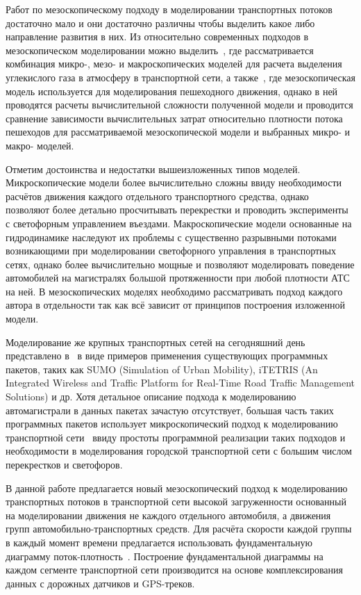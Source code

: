 Работ по мезоскопическому подходу в моделировании транспортных потоков достаточно мало и они достаточно различны чтобы выделить какое либо направление развития в них.
Из относительно современных подходов в мезоскопическом моделировании можно выделить~\autocite{oskarbski2018applying}, где рассматривается комбинация микро-, мезо- и макроскопических моделей для расчета выделения углекислого газа в атмосферу в транспортной сети, а также~\autocite{tordeux2018mesoscopic}, где мезоскопическая модель используется для моделирования пешеходного движения, однако в ней проводятся расчеты вычислительной сложности полученной модели и проводится сравнение зависимости вычислительных затрат относительно плотности потока пешеходов для рассматриваемой мезоскопической модели и выбранных микро- и макро- моделей.

Отметим достоинства и недостатки вышеизложенных типов моделей. 
Микроскопические модели более вычислительно сложны ввиду необходимости расчётов движения каждого отдельного транспортного средства, однако позволяют более детально просчитывать перекрестки и проводить эксперименты с светофорным управлением въездами. 
Макроскопические модели основанные на гидродинамике наследуют их проблемы с существенно разрывными потоками возникающими при моделировании светофорного управления в транспортных сетях, однако более вычислительно мощные и позволяют моделировать поведение автомобилей на магистралях большой протяженности при любой плотности АТС на ней.
В мезоскопических моделях необходимо рассматривать подход каждого автора в отдельности так как всё зависит от принципов построения изложенной модели.

Моделирование же крупных транспортных сетей на сегодняшний день представлено в~\autocite{asano2015traffic, bieker2015traffic} в
виде примеров применения существующих программных пакетов, таких как SUMO (Simulation of Urban Mobility),
iTETRIS (An Integrated Wireless and Traffic Platform for Real-Time Road Traffic Management Solutions) и др.
Хотя детальное описание подхода к моделированию автомагистрали в данных пакетах зачастую отсутствует, большая часть таких программных пакетов использует микроскопический подход к моделированию транспортной сети~\autocite{ratrout2009comparative} ввиду простоты программной реализации таких подходов и необходимости в моделирования городской транспортной сети с большим числом перекрестков и светофоров.

В данной работе предлагается новый мезоскопический подход к моделированию транспортных потоков в транспортной сети высокой загруженности основанный на моделировании движения не каждого отдельного автомобиля, а движения групп автомобильно-транспортных средств. 
Для расчёта скорости каждой группы в каждый момент времени предлагается использовать фундаментальную диаграмму поток-плотность~\autocite{collectiveArticle2}.
Построение фундаментальной диаграммы на каждом сегменте транспортной сети производится на основе комплексирования данных с дорожных датчиков и GPS-треков.


